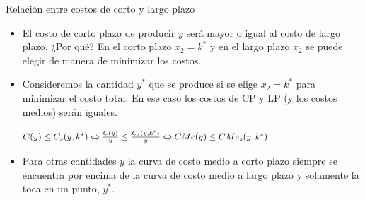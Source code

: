 \documentclass{beamer}
\theoremstyle{definition}
\begin{document}
\begin{frame}{Relaci\'on entre costos de corto y largo plazo}
\begin{itemize}

\item El costo de corto plazo de producir $y$ será mayor o igual al costo de largo plazo. ¿Por qué? En el corto plazo $x_2=k^*$ y en el largo plazo $x_2$ se puede elegir de manera de minimizar los costos.

\item Consideremos la cantidad $y^*$ que se produce si se elige $x_2=k^*$ para minimizar el costo total. En ese caso los costos de CP y LP (y los costos medios) serán iguales. 

\begin{center}
$\scalebox{0.9}{$C(y)\leq C_s(y,k^*) \Leftrightarrow \frac{C(y)}{y}\leq \frac{C_s(y,k^*)}{y} \Leftrightarrow CMe(y)\leq CMe_s(y,k^*)$}$
\end{center}
\item Para otras cantidades $y$ la curva de costo medio a corto plazo siempre se encuentra por encima de la curva de costo medio a largo plazo y solamente la toca en un punto, $y^*$.
\end{itemize}
\end{frame}
\end{document}
